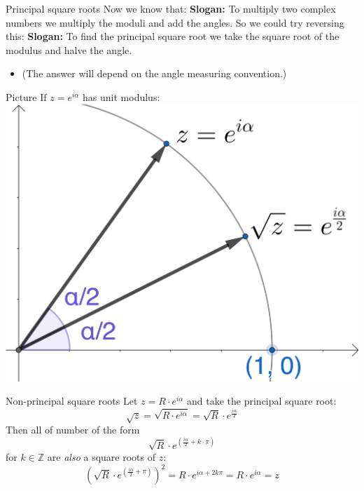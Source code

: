 \documentclass{beamer}
\begin{document}
\begin{frame}{Principal square roots}
Now we know that:\vfill
{\bf Slogan:} To multiply two complex numbers we multiply the moduli and add the angles.\vfill
So we could try reversing this:\vfill
{\bf Slogan:} To find the principal square root we take the square root of the modulus and halve the angle.\vfill
\begin{itemize}
	\item (The answer will depend on the angle measuring convention.)
\end{itemize}
\end{frame}

\begin{frame}{Picture}
If $z = e^{i\alpha}$ has unit modulus:\vfill
\includegraphics[scale=5]{principal-square-root.png}
\end{frame}

\begin{frame}{Non-principal square roots}
Let $z = R\cdot e^{i\alpha}$ and take the principal square root:\vfill
{\LARGE
\begin{equation*}
\sqrt{z} = \sqrt{R\cdot e^{i\alpha}} = \sqrt{R}\cdot e^{\frac{i\alpha}{2}}
\end{equation*}
}\vfill
Then all of number of the form\vfill
{\LARGE
\begin{equation*}
\sqrt{R}\cdot e^{(\frac{i\alpha}{2}+k\cdot\pi)}
\end{equation*}
}\vfill
for $k\in \mathbb{Z}$ are \emph{also} a square roots of $z$:\vfill
{\LARGE
\begin{equation*}
\left(\sqrt{R}\cdot e^{(\frac{i\alpha}{2}+\pi)}\right)^2 = R\cdot e^{i\alpha + 2k\pi} = R\cdot e^{i\alpha} = z
\end{equation*}
}
\end{frame}
\end{document}
